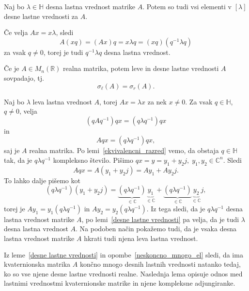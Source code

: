 \documentclass[mat1, tisk]{fmfdelo}
\numberwithin{equation}{section}
\begin{document}
\begin{lema}\label{desne lastne vrednosti}
    Naj bo $\lambda \in \mathbb{H}$ desna lastna vrednost matrike $A$. Potem so 
    tudi vsi elementi v $[\lambda]$ desne lastne vrednosti za $A$.
\end{lema}

\begin{dokaz}
    Če velja
    $Ax = x \lambda$,  
    sledi 
    $$A(xq) = (Ax)q = x\lambda q = (xq)(q^{-1}\lambda q)$$
    za vsak $q \neq 0$, torej je tudi $q^{-1}\lambda q$ desna lastna vrednost.
\end{dokaz}

\begin{trditev}
    Če je $A \in M_{n}(\mathbb{R})$ realna matrika, potem leve in desne lastne vrednosti $A$ sovpadajo, tj.
    \[\sigma_{\ell}(A) = \sigma_{r}(A).\]
\end{trditev}

\begin{dokaz}
    Naj bo $\lambda$ leva lastna vrednost $A$, torej $Ax = \lambda x$ za nek $x \neq 0$. Za vsak $q \in \mathbb{H}$, $q \neq 0$, velja
    \[(qAq^{-1})qx = (q\lambda q^{-1})qx\]
    in
    \[Aqx = (q\lambda q^{-1})qx,\]
    saj je $A$ realna matrika. Po lemi~\ref{ekvivalencni_razred} vemo, da obstaja $q \in \mathbb{H}$ tak, da je $q\lambda q^{-1}$ kompleksno število. Pišimo
    $qx = y = y_{1} + y_{2}j, \;  y_{1}, y_{2} \in \mathbb{C}^{n}$.
    Sledi
    \[Aqx = A(y_{1} + y_{2}j) = Ay_{1} + Ay_{2}j.\]
    To lahko dalje pišemo kot
    \[(q\lambda q^{-1})(y_{1} + y_{2}j) = \underbrace{(q\lambda q^{-1})}_{\in \mathbb{C}} \underbrace{y_{1}}_{\in \mathbb{C}} + \underbrace{(q\lambda q^{-1})}_{\in \mathbb{C}}\underbrace{y_{2}}_{\in \mathbb{C}}j,\]
    torej je 
    $Ay_{1} = y_{1}(q\lambda q^{-1})$ in $Ay_{2} = y_{2}(q\lambda q^{-1})$.
    Iz tega sledi, da je $q\lambda q^{-1}$ desna lastna vrednost matrike $A$, po lemi~\ref{desne lastne vrednosti} pa velja, da je tudi
    $\lambda$ desna lastna vrednost $A$. Na podoben način pokažemo tudi, da je vsaka desna lastna 
    vrednost matrike $A$ hkrati tudi njena leva lastna vrednost.
\end{dokaz}

Iz leme~\ref{desne lastne vrednosti} in opombe~\ref{neskoncno_mnogo_el} sledi, da ima kvaternionska matrika $A$ končno mnogo desnih lastnih vrednosti natanko tedaj, ko so
vse njene desne lastne vrednosti realne. Naslednja lema opisuje odnos med lastnimi vrednostmi kvaternionske matrike 
in njene kompleksne adjungiranke.
\end{document}
